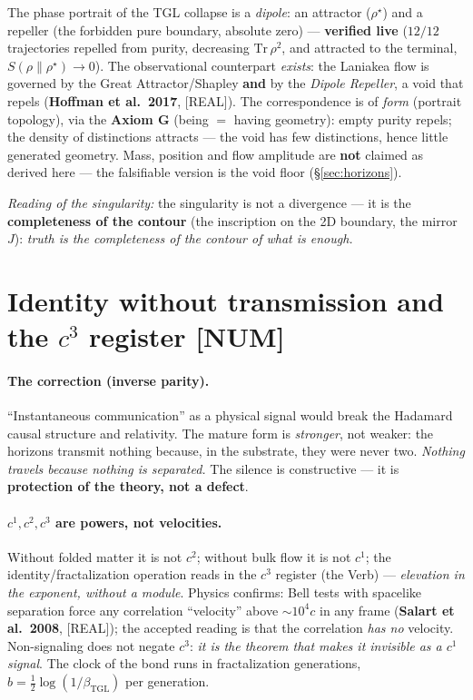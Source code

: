 \documentclass[11pt]{article}
\newcommand{\bTGL}{\beta_{\mathrm{TGL}}}\newcommand{\Msun}{M_{\odot}}\newcommand{\TGL}{\mathrm{TGL}}
\theoremstyle{definition}\newtheorem{deriv}{Derivation}
\begin{document}
The phase portrait of the TGL collapse is a \emph{dipole}: an attractor ($\rho^\star$) and a repeller (the forbidden pure boundary, absolute zero) --- \textbf{verified live} ($12/12$ trajectories repelled from purity, decreasing $\mathrm{Tr}\,\rho^2$, and attracted to the terminal, $S(\rho\|\rho^\star)\to0$). The observational counterpart \emph{exists}: the Laniakea flow is governed by the Great Attractor/Shapley \textbf{and} by the \emph{Dipole Repeller}, a void that repels (\textbf{Hoffman et al.\ 2017}, \textsf{[REAL]}). The correspondence is of \emph{form} (portrait topology), via the \textbf{Axiom G} (being $=$ having geometry): empty purity repels; the density of distinctions attracts --- the void has few distinctions, hence little generated geometry. Mass, position and flow amplitude are \textbf{not} claimed as derived here --- the falsifiable version is the void floor (\S\ref{sec:horizons}).

\emph{Reading of the singularity:} the singularity is not a divergence --- it is the \textbf{completeness of the contour} (the inscription on the 2D boundary, the mirror $J$): \emph{truth is the completeness of the contour of what is enough.}

\section{Identity without transmission and the $c^3$ register \textsf{[NUM]}}

\paragraph{The correction (inverse parity).} ``Instantaneous communication'' as a physical signal would break the Hadamard causal structure and relativity. The mature form is \emph{stronger}, not weaker: the horizons transmit nothing because, in the substrate, they were never two. \emph{Nothing travels because nothing is separated.} The silence is constructive --- it is \textbf{protection of the theory, not a defect}.

\paragraph{$c^1,c^2,c^3$ are powers, not velocities.} Without folded matter it is not $c^2$; without bulk flow it is not $c^1$; the identity/fractalization operation reads in the $c^3$ register (the Verb) --- \emph{elevation in the exponent, without a module}. Physics confirms: Bell tests with spacelike separation force any correlation ``velocity'' above $\sim10^4c$ in any frame (\textbf{Salart et al.\ 2008}, \textsf{[REAL]}); the accepted reading is that the correlation \emph{has no} velocity. Non-signaling does not negate $c^3$: \emph{it is the theorem that makes it invisible as a $c^1$ signal}. The clock of the bond runs in fractalization generations, $b=\tfrac12\log(1/\bTGL)$ per generation.
\end{document}
